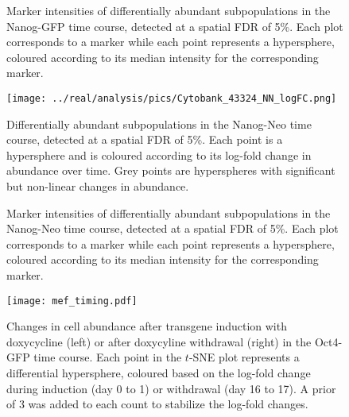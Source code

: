 \documentclass{article}
\begin{document}
\begin{figure}[p]
    \begin{center}
    \end{center}
    \caption{
        Marker intensities of differentially abundant subpopulations in the Nanog-GFP time course, detected at a spatial FDR of 5\%.
        Each plot corresponds to a marker while each point represents a hypersphere, coloured according to its median intensity for the corresponding marker.
    }
\end{figure}

\begin{figure}[p]
    \begin{center}
    \texttt{[image: ../real/analysis/pics/Cytobank\_43324\_NN\_logFC.png]}
    \end{center}
    \caption{
        Differentially abundant subpopulations in the Nanog-Neo time course, detected at a spatial FDR of 5\%.
        Each point is a hypersphere and is coloured according to its log-fold change in abundance over time.
        Grey points are hyperspheres with significant but non-linear changes in abundance.
    }
\end{figure}

\begin{figure}[p]
    \begin{center}
    \end{center}
    \caption{
        Marker intensities of differentially abundant subpopulations in the Nanog-Neo time course, detected at a spatial FDR of 5\%.
        Each plot corresponds to a marker while each point represents a hypersphere, coloured according to its median intensity for the corresponding marker.
    }
\end{figure}

\begin{figure}[bt]
    \begin{center}
        \texttt{[image: mef\_timing.pdf]}
    \end{center}
    \caption{
        Changes in cell abundance after transgene induction with doxycycline (left) or after doxycyline withdrawal (right) in the Oct4-GFP time course.
        Each point in the $t$-SNE plot represents a differential hypersphere, coloured based on the log-fold change during induction (day 0 to 1) or withdrawal (day 16 to 17).
        A prior of 3 was added to each count to stabilize the log-fold changes.
    }
    \label{fig:importanttime}
\end{figure}
\end{document}
